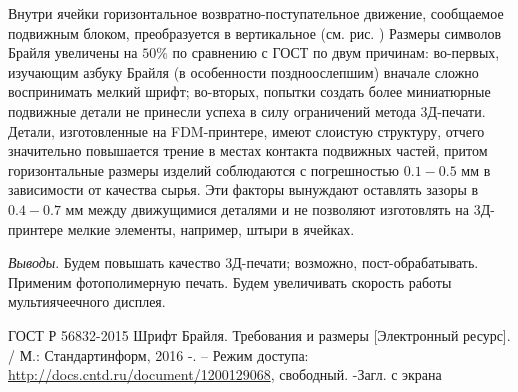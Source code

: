 \documentclass[a4paper,12pt]{article} %
\begin{document}
Внутри ячейки горизонтальное возвратно-поступательное движение, сообщаемое подвижным блоком, преобразуется в вертикальное (см. рис. ) Размеры символов Брайля увеличены на $50\%$ по сравнению с ГОСТ \cite{gost} по двум причинам: во-первых, изучающим азбуку Брайля (в особенности поздноослепшим) вначале сложно воспринимать мелкий шрифт; во-вторых, попытки создать более миниатюрные подвижные детали не принесли успеха в силу ограничений метода 3Д-печати. Детали, изготовленные на FDM-принтере, имеют слоистую структуру, отчего значительно повышается трение в местах контакта подвижных частей, притом горизонтальные размеры изделий соблюдаются с погрешностью $0.1-0.5$ мм в зависимости от качества сырья. Эти факторы вынуждают оставлять зазоры в $0.4-0.7$ мм между движущимися деталями и не позволяют изготовлять на 3Д-принтере мелкие элементы, например, штыри в ячейках.

\textit{Выводы}.
Будем повышать качество 3Д-печати; возможно, пост-обрабатывать. Применим фотополимерную печать. Будем увеличивать скорость работы мультиячеечного дисплея.

\begin{thebibliography}{100}
	
	
	 ГОСТ Р 56832-2015 Шрифт Брайля. Требования и размеры [Электронный ресурс]. / М.: Стандартинформ, 2016 -. -- Режим доступа:  \url{http://docs.cntd.ru/document/1200129068}, свободный. -Загл. с экрана
\end{thebibliography}
\end{document}
